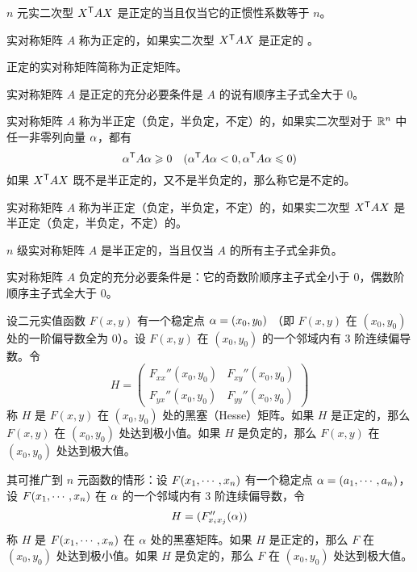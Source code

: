 \begin{theorem}
    $n$ 元实二次型 ${X}^\mathsf{T}AX$ 是正定的当且仅当它的正惯性系数等于 $n$。
\end{theorem}

\begin{definition}
    实对称矩阵 $A$ 称为正定的，如果实二次型 ${X}^\mathsf{T}AX$ 是正定的 。
\end{definition}

正定的实对称矩阵简称为正定矩阵。

\begin{theorem}
    实对称矩阵 $A$ 是正定的充分必要条件是 $A$ 的说有顺序主子式全大于 $0$。
\end{theorem}

\begin{definition}
    实对称矩阵 $A$ 称为半正定（负定，半负定，不定）的，如果实二次型对于 $\mathbb{R}^n$ 中任一非零列向量 $\alpha$，都有
    \[{\alpha}^\mathsf{T}A\alpha \geqslant 0 \quad ({\alpha}^\mathsf{T}A\alpha<0,{\alpha}^\mathsf{T}A\alpha\leqslant 0)\]
    如果 ${X}^\mathsf{T}AX$ 既不是半正定的，又不是半负定的，那么称它是不定的。
\end{definition}

\begin{definition}
    实对称矩阵 $A$ 称为半正定（负定，半负定，不定）的，如果实二次型 ${X}^\mathsf{T}AX$ 是半正定（负定，半负定，不定）的。
\end{definition}

\begin{theorem}
    $n$ 级实对称矩阵 $A$ 是半正定的，当且仅当 $A$ 的所有主子式全非负。
\end{theorem}

\begin{theorem}
    实对称矩阵 $A$ 负定的充分必要条件是：它的奇数阶顺序主子式全小于 $0$，偶数阶顺序主子式全大于 $0$。
\end{theorem}

\begin{theorem}
    设二元实值函数 $F(x,y)$ 有一个稳定点 $\alpha=(x_0,y_0)$ （即 $F(x,y)$ 在 $(x_0,y_0)$ 处的一阶偏导数全为 $0$）。设 $F(x,y)$ 在 $(x_0,y_0)$ 的一个邻域内有 3 阶连续偏导数。令
    \[H = \left(\begin{matrix}
        F_{xx}''(x_0,y_0) & F_{xy}''(x_0,y_0)\\
        F_{yx}''(x_0,y_0) & F_{yy}''(x_0,y_0)
    \end{matrix}\right)\]
    称 $H$ 是 $F(x,y)$ 在 $(x_0,y_0)$ 处的黑塞（Hesse）矩阵。如果 $H$ 是正定的，那么 $F(x,y)$ 在 $(x_0,y_0)$ 处达到极小值。如果 $H$ 是负定的，那么 $F(x,y)$ 在 $(x_0,y_0)$ 处达到极大值。
\end{theorem}

其可推广到 $n$ 元函数的情形：设 $F(x_1,\cdots,x_n)$ 有一个稳定点 $\alpha = (a_1,\cdots,a_n)$，设 $F(x_1,\cdots,x_n)$ 在 $\alpha$ 的一个邻域内有 3 阶连续偏导数，令
\[H = (F_{x_ix_j}''(\alpha))\]
称 $H$ 是 $F(x_1,\cdots,x_n)$ 在 $\alpha$ 处的黑塞矩阵。如果 $H$ 是正定的，那么 $F$ 在 $(x_0,y_0)$ 处达到极小值。如果 $H$ 是负定的，那么 $F$ 在 $(x_0,y_0)$ 处达到极大值。